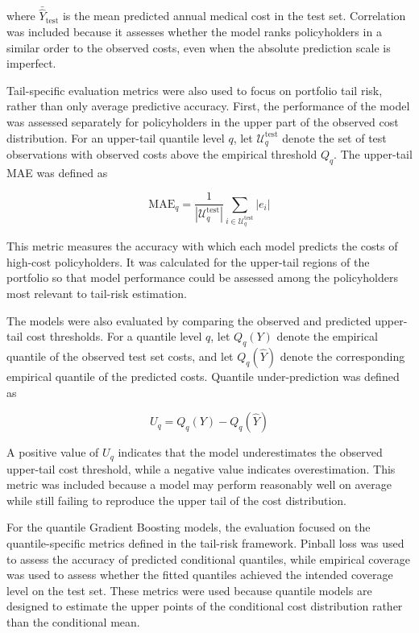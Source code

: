 	where \(\bar{\hat{Y}}_{\mathrm{test}}\) is the mean predicted annual medical cost in the test set. Correlation was included because it assesses whether the model ranks policyholders in a similar order to the observed costs, even when the absolute prediction scale is imperfect.
	
	Tail-specific evaluation metrics were also used to focus on portfolio tail risk, rather than only average predictive accuracy. First, the performance of the model was assessed separately for policyholders in the upper part of the observed cost distribution. For an upper-tail quantile level \(q\), let \(\mathcal{U}_q^{\mathrm{test}}\) denote the set of test observations with observed costs above the empirical threshold \(Q_q\). The upper-tail MAE was defined as
	
	\begin{equation}
		\mathrm{MAE}_q
		=
		\frac{1}{|\mathcal{U}_q^{\mathrm{test}}|}
		\sum_{i \in \mathcal{U}_q^{\mathrm{test}}}
		\left| e_i \right|
	\end{equation}
	
	This metric measures the accuracy with which each model predicts the costs of high-cost policyholders. It was calculated for the upper-tail regions of the portfolio so that model performance could be assessed among the policyholders most relevant to tail-risk estimation.
	
	The models were also evaluated by comparing the observed and predicted upper-tail cost thresholds. For a quantile level \(q\), let \(Q_q(Y)\) denote the empirical quantile of the observed test set costs, and let \(Q_q(\hat{Y})\) denote the corresponding empirical quantile of the predicted costs. Quantile under-prediction was defined as
	
	\begin{equation}
		U_q
		=
		Q_q(Y) - Q_q(\hat{Y})
	\end{equation}
	
	A positive value of \(U_q\) indicates that the model underestimates the observed upper-tail cost threshold, while a negative value indicates overestimation. This metric was included because a model may perform reasonably well on average while still failing to reproduce the upper tail of the cost distribution.
	
	For the quantile Gradient Boosting models, the evaluation focused on the quantile-specific metrics defined in the tail-risk framework. Pinball loss was used to assess the accuracy of predicted conditional quantiles, while empirical coverage was used to assess whether the fitted quantiles achieved the intended coverage level on the test set. These metrics were used because quantile models are designed to estimate the upper points of the conditional cost distribution rather than the conditional mean.
	

